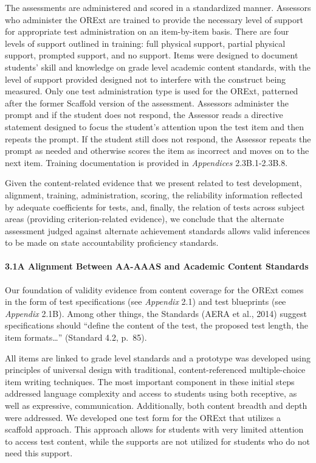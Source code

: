 \documentclass[]{article}
\let\oldparagraph\paragraph
\renewcommand{\paragraph}[1]{\oldparagraph{#1}\mbox{}}
\begin{document}
The assessments are administered and scored in a standardized manner.
Assessors who administer the ORExt are trained to provide the necessary
level of support for appropriate test administration on an item-by-item
basis. There are four levels of support outlined in training: full
physical support, partial physical support, prompted support, and no
support. Items were designed to document students' skill and knowledge
on grade level academic content standards, with the level of support
provided designed not to interfere with the construct being measured.
Only one test administration type is used for the ORExt, patterned after
the former Scaffold version of the assessment. Assessors administer the
prompt and if the student does not respond, the Assessor reads a
directive statement designed to focus the student's attention upon the
test item and then repeats the prompt. If the student still does not
respond, the Assessor repeats the prompt as needed and otherwise scores
the item as incorrect and moves on to the next item. Training
documentation is provided in \emph{Appendices} 2.3B.1-2.3B.8.

Given the content-related evidence that we present related to test
development, alignment, training, administration, scoring, the
reliability information reflected by adequate coefficients for tests,
and, finally, the relation of tests across subject areas (providing
criterion-related evidence), we conclude that the alternate assessment
judged against alternate achievement standards allows valid inferences
to be made on state accountability proficiency standards.

\paragraph{3.1A Alignment Between AA-AAAS and Academic Content
Standards}\label{a-alignment-between-aa-aaas-and-academic-content-standards}

Our foundation of validity evidence from content coverage for the ORExt
comes in the form of test specifications (see \emph{Appendix} 2.1) and
test blueprints (see \emph{Appendix} 2.1B). Among other things, the
Standards (AERA et al., 2014) suggest specifications should ``define the
content of the test, the proposed test length, the item
formats\ldots{}'' (Standard 4.2, p.~85).

All items are linked to grade level standards and a prototype was
developed using principles of universal design with traditional,
content-referenced multiple-choice item writing techniques. The most
important component in these initial steps addressed language complexity
and access to students using both receptive, as well as expressive,
communication. Additionally, both content breadth and depth were
addressed. We developed one test form for the ORExt that utilizes a
scaffold approach. This approach allows for students with very limited
attention to access test content, while the supports are not utilized
for students who do not need this support.
\end{document}
